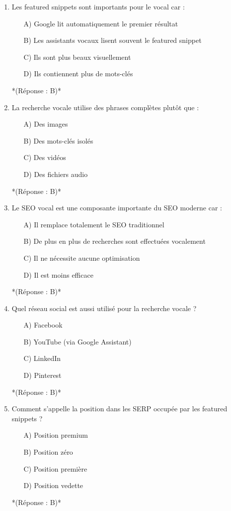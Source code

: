 \documentclass[12pt,a4paper,twoside]{report}
\begin{document}
\begin{enumerate}
    \item Les featured snippets sont importants pour le vocal car :
    \begin{itemize}
        \item[A)] Google lit automatiquement le premier résultat
        \item[B)] Les assistants vocaux lisent souvent le featured snippet
        \item[C)] Ils sont plus beaux visuellement
        \item[D)] Ils contiennent plus de mots-clés
    \end{itemize}
    *(Réponse : B)*

    \item La recherche vocale utilise des phrases complètes plutôt que :
    \begin{itemize}
        \item[A)] Des images
        \item[B)] Des mots-clés isolés
        \item[C)] Des vidéos
        \item[D)] Des fichiers audio
    \end{itemize}
    *(Réponse : B)*

    \item Le SEO vocal est une composante importante du SEO moderne car :
    \begin{itemize}
        \item[A)] Il remplace totalement le SEO traditionnel
        \item[B)] De plus en plus de recherches sont effectuées vocalement
        \item[C)] Il ne nécessite aucune optimisation
        \item[D)] Il est moins efficace
    \end{itemize}
    *(Réponse : B)*

    \item Quel réseau social est aussi utilisé pour la recherche vocale ?
    \begin{itemize}
        \item[A)] Facebook
        \item[B)] YouTube (via Google Assistant)
        \item[C)] LinkedIn
        \item[D)] Pinterest
    \end{itemize}
    *(Réponse : B)*

    \item Comment s'appelle la position dans les SERP occupée par les featured snippets ?
    \begin{itemize}
        \item[A)] Position premium
        \item[B)] Position zéro
        \item[C)] Position première
        \item[D)] Position vedette
    \end{itemize}
    *(Réponse : B)*


\end{enumerate}
\end{document}
